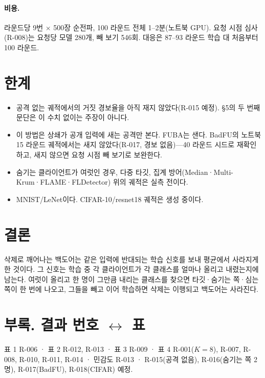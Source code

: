 \documentclass[10pt,a4paper]{article}
\begin{document}
\paragraph{비용.} 라운드당 9번 $\times$ 500장 순전파, 100 라운드 전체 1--2분(노트북 GPU). 요청 시점 심사(R-008)는 요청당 모델 280개, 빼 보기 546회. 대응은 87--93 라운드 학습 대 처음부터 100 라운드.

\section{한계}
\begin{itemize}
\item 공격 없는 궤적에서의 거짓 경보율을 아직 재지 않았다(R-015 예정). \S5의 두 번째 문단은 이 수치 없이는 주장이 아니다.
\item 이 방법은 상쇄가 공개 입력에 새는 공격만 본다. FUBA는 샌다. BadFU의 노트북 15 라운드 궤적에서는 새지 않았다(R-017, 경보 없음)---40 라운드 시드로 재확인하고, 새지 않으면 요청 시점 빼 보기로 보완한다.
\item 숨기는 클라이언트가 여럿인 경우, 다중 타깃, 집계 방어(Median·Multi-Krum·FLAME·FLDetector) 위의 궤적은 실측 전이다.
\item MNIST/LeNet이다. CIFAR-10/resnet18 궤적은 생성 중이다.
\end{itemize}

\section{결론}
삭제로 깨어나는 백도어는 같은 입력에 반대되는 학습 신호를 보내 평균에서 사라지게 한 것이다. 그 신호는 학습 중 각 클라이언트가 각 클래스를 얼마나 올리고 내렸는지에 남는다. 여럿이 올리고 한 명이 그만큼 내리는 클래스를 찾으면 타깃·숨기는 쪽·심는 쪽이 한 번에 나오고, 그들을 빼고 이어 학습하면 삭제는 이행되고 백도어는 사라진다.

\section*{부록. 결과 번호 $\leftrightarrow$ 표}
표 1 R-006 · 표 2 R-012, R-013 · 표 3 R-009 · 표 4 R-001($K=8$), R-007, R-008, R-010, R-011, R-014 · 민감도 R-013 · R-015(공격 없음), R-016(숨기는 쪽 2명), R-017(BadFU), R-018(CIFAR) 예정.
\end{document}
